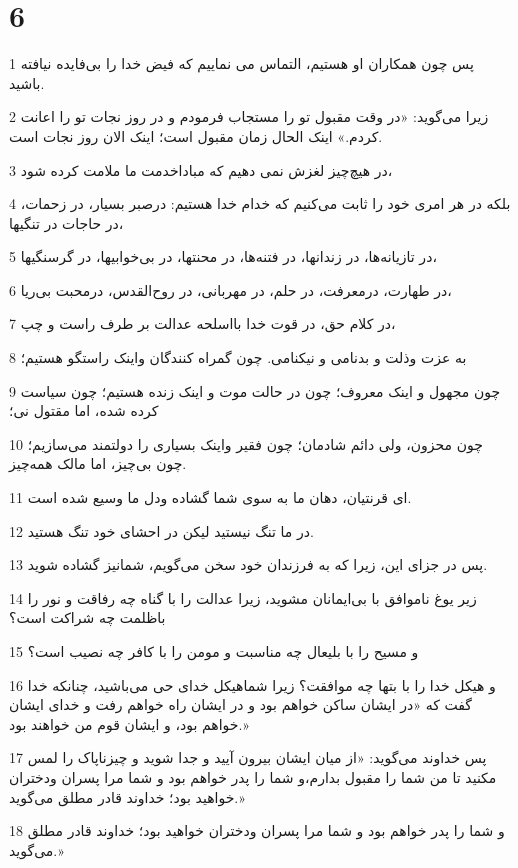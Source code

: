 \chapter{6}

\par 1 پس چون همکاران او هستیم، التماس می نماییم که فیض خدا را بی‌فایده نیافته باشید.
\par 2 زیرا می‌گوید: «در وقت مقبول تو را مستجاب فرمودم و در روز نجات تو را اعانت کردم.» اینک الحال زمان مقبول است؛ اینک الان روز نجات است.
\par 3 در هیچ‌چیز لغزش نمی دهیم که مباداخدمت ما ملامت کرده شود،
\par 4 بلکه در هر امری خود را ثابت می‌کنیم که خدام خدا هستیم: درصبر بسیار، در زحمات، در حاجات در تنگیها،
\par 5 در تازیانه‌ها، در زندانها، در فتنه‌ها، در محنتها، در بی‌خوابیها، در گرسنگیها،
\par 6 در طهارت، درمعرفت، در حلم، در مهربانی، در روح‌القدس، درمحبت بی‌ریا،
\par 7 در کلام حق، در قوت خدا بااسلحه عدالت بر طرف راست و چپ،
\par 8 به عزت وذلت و بدنامی و نیکنامی. چون گمراه کنندگان واینک راستگو هستیم؛
\par 9 چون مجهول و اینک معروف؛ چون در حالت موت و اینک زنده هستیم؛ چون سیاست کرده شده، اما مقتول نی؛
\par 10 چون محزون، ولی دائم شادمان؛ چون فقیر واینک بسیاری را دولتمند می‌سازیم؛ چون بی‌چیز، اما مالک همه‌چیز.
\par 11 ‌ای قرنتیان، دهان ما به سوی شما گشاده ودل ما وسیع شده است.
\par 12 در ما تنگ نیستید لیکن در احشای خود تنگ هستید.
\par 13 پس در جزای این، زیرا که به فرزندان خود سخن می‌گویم، شمانیز گشاده شوید.
\par 14 زیر یوغ ناموافق با بی‌ایمانان مشوید، زیرا عدالت را با گناه چه رفاقت و نور را باظلمت چه شراکت است؟
\par 15 و مسیح را با بلیعال چه مناسبت و مومن را با کافر چه نصیب است؟
\par 16 و هیکل خدا را با بتها چه موافقت؟ زیرا شماهیکل خدای حی می‌باشید، چنانکه خدا گفت که «در ایشان ساکن خواهم بود و در ایشان راه خواهم رفت و خدای ایشان خواهم بود، و ایشان قوم من خواهند بود.»
\par 17 پس خداوند می‌گوید: «از میان ایشان بیرون آیید و جدا شوید و چیزناپاک را لمس مکنید تا من شما را مقبول بدارم،و شما را پدر خواهم بود و شما مرا پسران ودختران خواهید بود؛ خداوند قادر مطلق می‌گوید.»
\par 18 و شما را پدر خواهم بود و شما مرا پسران ودختران خواهید بود؛ خداوند قادر مطلق می‌گوید.»

